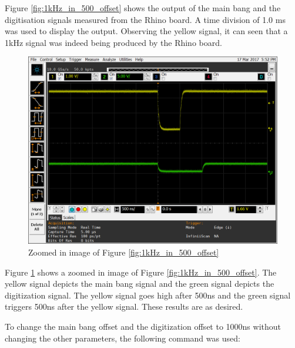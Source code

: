 \documentclass[12pt, a4paper]{article}
\begin{document}
Figure \ref{fig:1kHz_in_500_offset} shows the output of the main bang and the digitisation signals measured from the Rhino board. A time division of 1.0 ms was used to display the output. Observing the yellow signal, it can seen that a 1kHz signal was indeed being produced by the Rhino board.

	\begin{figure}[t]
		\centering
		\includegraphics[width=13cm]{1khz_mb_offset_500_ns_length_of_offset}
		\caption{Zoomed in image of Figure \ref{fig:1kHz_in_500_offset}}
		\label{fig:1kHz_in_500_offset_zoom}
	\end{figure}
		
	
Figure \ref{fig:1kHz_in_500_offset_zoom} shows a zoomed in image of Figure \ref{fig:1kHz_in_500_offset}. The yellow signal depicts the main bang signal and the green signal depicts the digitization signal. The yellow signal goes high after 500ns and the green signal triggers 500ns after the yellow signal. These results are as desired. 

To change the main bang offset and the digitization offset to \hypertarget{1000ns_offset}{1000ns} without changing the other parameters, the following command was used:


	
\end{document}
